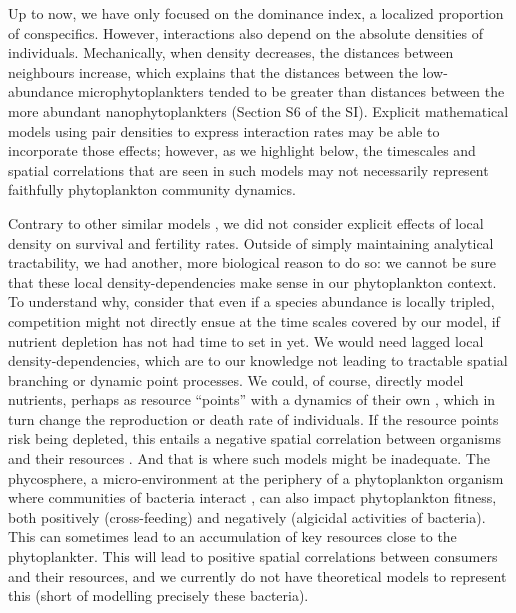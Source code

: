 \documentclass[english]{article}
\begin{document}
Up to now, we have only focused on the dominance index, a localized
proportion of conspecifics. However, interactions also depend on the
absolute densities of individuals. Mechanically, when density decreases,
the distances between neighbours increase, which explains that the
distances between the low-abundance microphytoplankters tended to
be greater than distances between the more abundant nanophytoplankters
(Section S6 of the SI). Explicit mathematical models using pair densities
to express interaction rates \citep[e.g.][]{law_population_2003,plank_spatial_2015}
may be able to incorporate those effects; however, as we highlight
below, the timescales and spatial correlations that are seen in such
models may not necessarily represent faithfully phytoplankton community
dynamics. 

Contrary to other similar models \citep[e.g.,][]{birch_master_2006,bouderbala_3d_2018},
we did not consider explicit effects of local density on survival
and fertility rates. Outside of simply maintaining analytical tractability,
we had another, more biological reason to do so: we cannot be sure
that these local density-dependencies make sense in our phytoplankton
context. To understand why, consider that even if a species abundance
is locally tripled, competition might not directly ensue at the time
scales covered by our model, if nutrient depletion has not had time
to set in yet. We would need lagged local density-dependencies, which
are to our knowledge not leading to tractable spatial branching or
dynamic point processes. We could, of course, directly model nutrients,
perhaps as resource ``points'' with a dynamics of their own \citep{murrell_local_2005,north_interactions_2007},
which in turn change the reproduction or death rate of individuals.
If the resource points risk being depleted, this entails a negative
spatial correlation between organisms and their resources \citep{murrell_local_2005}.
And that is where such models might be inadequate. The phycosphere,
a micro-environment at the periphery of a phytoplankton organism where
communities of bacteria interact \citep{seymour_zooming_2017}, can
also impact phytoplankton fitness, both positively (cross-feeding)
and negatively (algicidal activities of bacteria). This can sometimes
lead to an accumulation of key resources close to the phytoplankter.
This will lead to positive spatial correlations between consumers
and their resources, and we currently do not have theoretical models
to represent this (short of modelling precisely these bacteria). 
\end{document}
